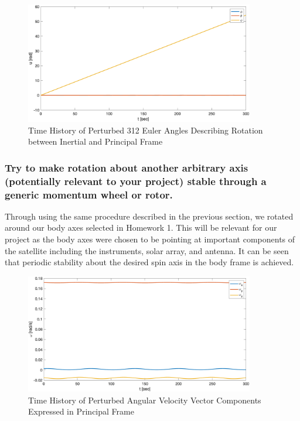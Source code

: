 \begin{figure}[H]
    \centering
    \captionsetup{justification = centering}
    \includegraphics[width = 10cm]{Images/PS4/mom_wheel_intermediate_stability_history_angles.png}
    \caption{Time History of Perturbed 312 Euler Angles Describing Rotation between Inertial and Principal Frame}
    \label{fig:mom_wheel_inermediate_stability_angles}
\end{figure}

\subsubsection{Try to make rotation about another arbitrary axis (potentially relevant to your project) stable
through a generic momentum wheel or rotor.}

Through using the same procedure described in the previous section, we rotated around our body axes selected in Homework 1. This will be relevant for our project as the body axes were chosen to be pointing at important components of the satellite including the instruments, solar array, and antenna. It can be seen that periodic stability about the desired spin axis in the body frame is achieved.

\begin{figure}[H]
    \centering
    \captionsetup{ justification = centering}
    \includegraphics[width = 10cm]{Images/PS4/mom_wheel_mission_stability_history_velocity.png}
    \caption{Time History of Perturbed Angular Velocity Vector Components Expressed in Principal Frame}
    \label{fig:mom_wheel_mission_stability_velocities}
\end{figure}

